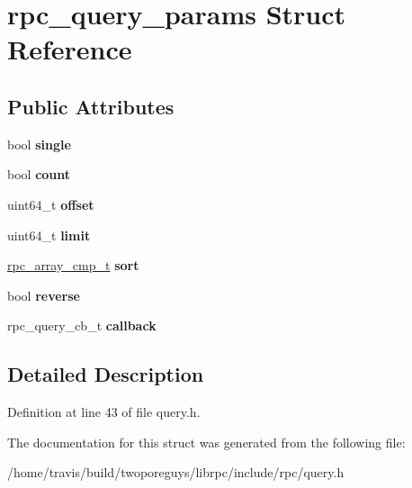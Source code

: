 \hypertarget{structrpc__query__params}{\section{rpc\-\_\-query\-\_\-params Struct Reference}
\label{structrpc__query__params}
}
\subsection*{Public Attributes}
\begin{DoxyCompactItemize}
\item 
\hypertarget{structrpc__query__params_a6e4eafac062b7f7490a4983d56296385}{bool {\bfseries single}}\label{structrpc__query__params_a6e4eafac062b7f7490a4983d56296385}

\item 
\hypertarget{structrpc__query__params_a7b488114aeb262c508dd28acc1a7fc95}{bool {\bfseries count}}\label{structrpc__query__params_a7b488114aeb262c508dd28acc1a7fc95}

\item 
\hypertarget{structrpc__query__params_a4e33edf4295472adcc84d6d1ccee2ddd}{uint64\-\_\-t {\bfseries offset}}\label{structrpc__query__params_a4e33edf4295472adcc84d6d1ccee2ddd}

\item 
\hypertarget{structrpc__query__params_a89ee7bc896675c8c2ef148436430ba0a}{uint64\-\_\-t {\bfseries limit}}\label{structrpc__query__params_a89ee7bc896675c8c2ef148436430ba0a}

\item 
\hypertarget{structrpc__query__params_a661d864b8637b469fd99f3b7392aa507}{\hyperlink{object_8h_a23bdaa1b433c1ae44515a60f06a86866}{rpc\-\_\-array\-\_\-cmp\-\_\-t} {\bfseries sort}}\label{structrpc__query__params_a661d864b8637b469fd99f3b7392aa507}

\item 
\hypertarget{structrpc__query__params_ad50d1e6e25322f5562ec1793647c1618}{bool {\bfseries reverse}}\label{structrpc__query__params_ad50d1e6e25322f5562ec1793647c1618}

\item 
\hypertarget{structrpc__query__params_ab8b50541840d07c084797048d22d589a}{rpc\-\_\-query\-\_\-cb\-\_\-t {\bfseries callback}}\label{structrpc__query__params_ab8b50541840d07c084797048d22d589a}

\end{DoxyCompactItemize}


\subsection{Detailed Description}


Definition at line 43 of file query.\-h.



The documentation for this struct was generated from the following file\-:\begin{DoxyCompactItemize}
\item 
/home/travis/build/twoporeguys/librpc/include/rpc/query.\-h\end{DoxyCompactItemize}
